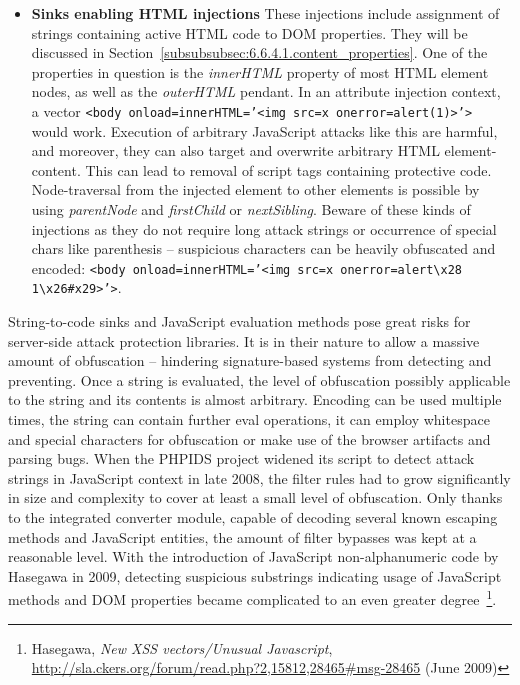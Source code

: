 \begin{itemize}
     \item \textbf{Sinks enabling HTML injections} These injections include assignment of strings containing active HTML code to DOM properties. They will be discussed in Section~\ref{subsubsubsec:6.6.4.1.content_properties}. One of the properties in question is the \textit{innerHTML} property of most HTML element nodes, as well as the \textit{outerHTML} pendant. In an attribute injection context, a vector \texttt{<body onload=innerHTML='<img src=x onerror=alert(1)>'>} would work. Execution of arbitrary JavaScript attacks like this are harmful, and moreover, they can also target and overwrite arbitrary HTML element-content. This can lead to removal of script tags containing protective code. Node-traversal from the injected element to other elements is possible by using \textit{parentNode} and \textit{firstChild} or \textit{nextSibling}. Beware of these kinds of injections as they do not require long attack strings or occurrence of special chars like parenthesis -- suspicious characters can be heavily obfuscated and encoded: \texttt{<body onload=innerHTML='<img src=x onerror=alert\textbackslash x28 1\textbackslash x26\#x29>'>}. 
    \end{itemize}

    String-to-code sinks and JavaScript evaluation methods pose great risks for server-side attack protection libraries. It is in their nature to allow a massive amount of obfuscation -- hindering signature-based systems from detecting and preventing. Once a string is evaluated, the level of obfuscation possibly applicable to the string and its contents is almost arbitrary. Encoding can be used multiple times, the string can contain further eval operations, it can employ whitespace and special characters for obfuscation or make use of the browser artifacts and parsing bugs. When the PHPIDS project widened its script to detect attack strings in JavaScript context in late 2008, the filter rules had to grow significantly in size and complexity to cover at least a small level of obfuscation. Only thanks to the integrated converter module, capable of decoding several known escaping methods and JavaScript entities, the amount of filter bypasses was kept at a reasonable level. With the introduction of JavaScript non-alphanumeric code by Hasegawa in 2009, detecting suspicious substrings indicating usage of JavaScript methods and DOM properties became complicated to an even greater degree~\footnote{Hasegawa, \textit{New XSS vectors/Unusual Javascript}, \url{http://sla.ckers.org/forum/read.php?2,15812,28465\#msg-28465} (June 2009)}. \\

